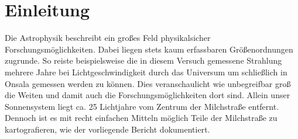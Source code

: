 \section{Einleitung}
Die Astrophysik beschreibt ein großes Feld physikalsicher Forschungsmöglichkeiten. Dabei liegen stets kaum erfassbaren Größenordnungen zugrunde. So reiste beispielsweise die in diesem Versuch gemessene Strahlung mehrere Jahre bei Lichtgeschwindigkeit durch das Universum um schließlich in Onsala gemessen werden zu können. Dies veranschaulicht wie unbegreifbar groß die Weiten und damit auch die Forschungsmöglichkeiten dort sind. Allein unser Sonnensystem liegt ca. 25 Lichtjahre vom Zentrum der Milchstraße entfernt. Dennoch ist es mit recht einfachen Mitteln möglich Teile der Milchstraße zu kartografieren, wie der vorliegende Bericht dokumentiert.
\newline